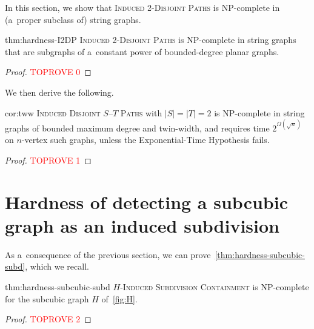 \documentclass[a4paper,UKenglish,cleveref,autoref]{lipics-v2021}
\begin{document}
In this section, we show that \textsc{Induced 2-Disjoint Paths} is NP-complete in (a~proper subclass of) string graphs.

\begin{reptheorem}{thm:hardness-I2DP}
  \textsc{Induced 2-Disjoint Paths} is NP-complete in string graphs that are subgraphs of a~constant power of bounded-degree planar graphs.
\end{reptheorem}

\begin{proof}\textcolor{red}{TOPROVE 0}\end{proof}

We then derive the following.

\begin{repcorollary}{cor:tww}
  \textsc{Induced Disjoint $S$--$T$ Paths} with $|S|=|T|=2$ is NP-complete in string graphs of bounded maximum degree and twin-width, and requires time $2^{\Omega(\sqrt n)}$ on $n$-vertex such graphs, unless the Exponential-Time Hypothesis fails.
\end{repcorollary}
\begin{proof}\textcolor{red}{TOPROVE 1}\end{proof}

\section{Hardness of detecting a subcubic graph as an induced subdivision}\label{sec:isc-imc}

As a~consequence of the previous section, we can prove~\cref{thm:hardness-subcubic-subd}, which we recall.

\begin{reptheorem}{thm:hardness-subcubic-subd}
  \textsc{$H$-Induced Subdivision Containment} is NP-complete for the subcubic graph $H$ of~\cref{fig:H}.
\end{reptheorem}

\begin{proof}\textcolor{red}{TOPROVE 2}\end{proof}
\end{document}
